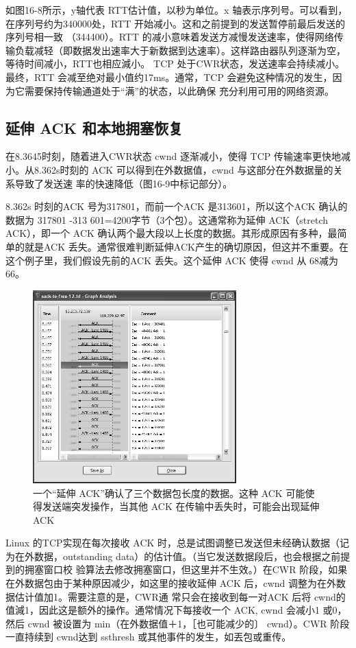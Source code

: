 如图16-8所示，y轴代表 RTT估计值，以秒为单位。x 轴表示序列号。可以看到，在序列号约为340000处，RTT 开始减小。这和之前提到的发送暂停前最后发送的序列号相一致
（344400）。RTT 的减小意味着发送方减慢发送速率，使得网络传输负载减轻（即数据发出速率大于新数据到达速率）。这样路由器队列逐渐为空，等待时间减小，RTT也相应減小。
TCP 处于CWR状态，发送速率会持续减小。最终，RTT 会减至绝对最小值约17ms。通常，TCP 会避免这种情况的发生，因为它需要保持传输通道处于“满”的状态，以此确保
充分利用可用的网络资源。

\subsection{延伸 ACK 和本地拥塞恢复}
在8.3645时刻，随着进入CWR状态 cwnd 逐渐减小，使得 TCP 传输速率更快地减小。从8.362s时刻的 ACK 可以得到在外数据值，cwnd 与这部分在外数据量的关系导致了发送速
率的快速降低（图16-9中标记部分）。

8.362s 时刻的ACK 号为317801，而前一个ACK 是313601，所以这个ACK 确认的数据为 317801 -313 601=4200字节（3个包）。这通常称为延伸 ACK（stretch ACK），即一个
ACK 确认两个最大段以上长度的数据。其形成原因有多种，最简单的就是ACK 丢失。通常很难判断延伸ACK产生的确切原因，但这并不重要。在这个例子里，我们假设先前的ACK
丢失。这个延伸 ACK 使得 cwnd 从 68减为66。

\begin{figure}[!htb]
    \centering
	\includegraphics[width=0.7\textwidth]{imgs/16/16-9.png}
	\caption{一个“延伸 ACK”确认了三个数据包长度的数据。这种 ACK 可能使得发送端突发操作，当其他 ACK 在传输中丢失时，可能会出现延伸ACK}
\end{figure}

Linux 的TCP实现在每次接收 ACK 时，总是试图调整已发送但未经确认数据（记为在外数据，outstanding data）的估计值。（当它发送数据段后，也会根据之前提到的拥塞窗口校
验算法去修改拥塞窗口，但这里并不生效。）在CWR 阶段，如果在外数据包由于某种原因减少，如这里的接收延伸 ACK 后，cwnd 调整为在外数据估计值加1。需要注意的是，CWR通
常只会在接收到每一对ACK 后将 cwnd的值減1，因此这是额外的操作。通常情况下每接收一个 ACK, cwnd 会减小1 或0，然后 cwnd 被设置为 min（在外数据值＋1，［也可能减少的〕
cwnd）。CWR 阶段一直持续到 cwnd达到 ssthresh 或其他事件的发生，如丟包或重传。

